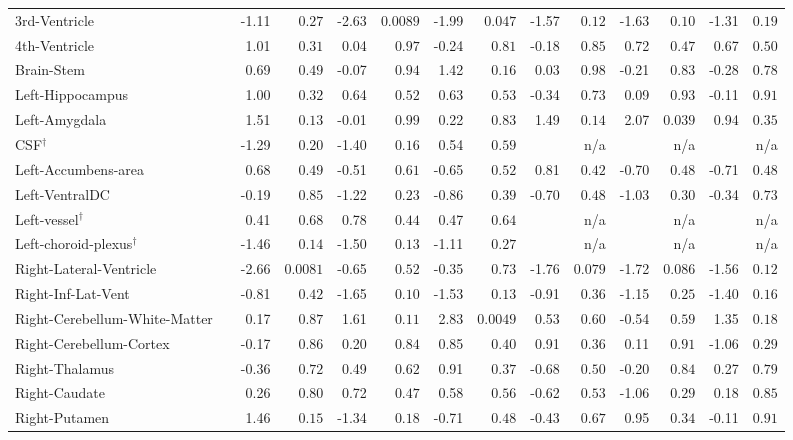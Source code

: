{\begin{longtable}{llrrrrrrrrrrrr}
3rd-Ventricle &  & -1.11 & $0.27$ & -2.63 & $0.0089$ & -1.99 & $0.047$ & -1.57 & $0.12$ & -1.63 & $0.10$ & -1.31 & $0.19$ \\
4th-Ventricle &  & 1.01 & $0.31$ & 0.04 & $0.97$ & -0.24 & $0.81$ & -0.18 & $0.85$ & 0.72 & $0.47$ & 0.67 & $0.50$ \\
Brain-Stem &  & 0.69 & $0.49$ & -0.07 & $0.94$ & 1.42 & $0.16$ & 0.03 & $0.98$ & -0.21 & $0.83$ & -0.28 & $0.78$ \\
Left-Hippocampus &  & 1.00 & $0.32$ & 0.64 & $0.52$ & 0.63 & $0.53$ & -0.34 & $0.73$ & 0.09 & $0.93$ & -0.11 & $0.91$ \\
Left-Amygdala &  & 1.51 & $0.13$ & -0.01 & $0.99$ & 0.22 & $0.83$ & 1.49 & $0.14$ & 2.07 & $0.039$ & 0.94 & $0.35$ \\
CSF$^{\dagger}$ &  & -1.29 & $0.20$ & -1.40 & $0.16$ & 0.54 & $0.59$ &  & n/a &  & n/a &  & n/a \\
Left-Accumbens-area &  & 0.68 & $0.49$ & -0.51 & $0.61$ & -0.65 & $0.52$ & 0.81 & $0.42$ & -0.70 & $0.48$ & -0.71 & $0.48$ \\
Left-VentralDC &  & -0.19 & $0.85$ & -1.22 & $0.23$ & -0.86 & $0.39$ & -0.70 & $0.48$ & -1.03 & $0.30$ & -0.34 & $0.73$ \\
Left-vessel$^{\dagger}$ &  & 0.41 & $0.68$ & 0.78 & $0.44$ & 0.47 & $0.64$ &  & n/a &  & n/a &  & n/a \\
Left-choroid-plexus$^{\dagger}$ &  & -1.46 & $0.14$ & -1.50 & $0.13$ & -1.11 & $0.27$ &  & n/a &  & n/a &  & n/a \\
Right-Lateral-Ventricle &  & -2.66 & $0.0081$ & -0.65 & $0.52$ & -0.35 & $0.73$ & -1.76 & $0.079$ & -1.72 & $0.086$ & -1.56 & $0.12$ \\
Right-Inf-Lat-Vent &  & -0.81 & $0.42$ & -1.65 & $0.10$ & -1.53 & $0.13$ & -0.91 & $0.36$ & -1.15 & $0.25$ & -1.40 & $0.16$ \\
Right-Cerebellum-White-Matter &  & 0.17 & $0.87$ & 1.61 & $0.11$ & 2.83 & $0.0049$ & 0.53 & $0.60$ & -0.54 & $0.59$ & 1.35 & $0.18$ \\
Right-Cerebellum-Cortex &  & -0.17 & $0.86$ & 0.20 & $0.84$ & 0.85 & $0.40$ & 0.91 & $0.36$ & 0.11 & $0.91$ & -1.06 & $0.29$ \\
Right-Thalamus &  & -0.36 & $0.72$ & 0.49 & $0.62$ & 0.91 & $0.37$ & -0.68 & $0.50$ & -0.20 & $0.84$ & 0.27 & $0.79$ \\
Right-Caudate &  & 0.26 & $0.80$ & 0.72 & $0.47$ & 0.58 & $0.56$ & -0.62 & $0.53$ & -1.06 & $0.29$ & 0.18 & $0.85$ \\
Right-Putamen &  & 1.46 & $0.15$ & -1.34 & $0.18$ & -0.71 & $0.48$ & -0.43 & $0.67$ & 0.95 & $0.34$ & -0.11 & $0.91$ \\

\end{longtable}}
